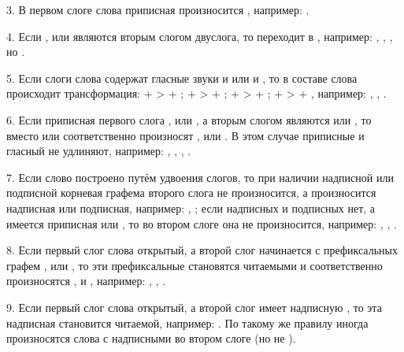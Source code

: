 3. В первом слоге слова приписная  произносится , например: .

4. Если ,  или  являются вторым слогом двуслога, то  переходит в , например: , , , но .

5. Если слоги слова содержат гласные звуки  и  или  и , то в составе слова происходит трансформация:  +  >  + ;  +  >  + ;  +  >  + ;  +  >  + , например: , , .

6. Если приписная первого слога ,  или , а вторым слогом являются  или , то вместо  или  соответственно произносят ,  или . В этом случае приписные  и гласный не удлиняют, например:
,
,
,
.

7. Если слово построено путём удвоения слогов, то при наличии надписной или подписной корневая графема второго слога не произносится, а произносится надписная или подписная, например:
, ;
если надписных и подписных нет, а имеется приписная  или , то во втором слоге она не произносится, например:
,
,
.

8. Если первый слог слова открытый, а второй слог начинается с префиксальных графем ,  или , то эти префиксальные становятся читаемыми и соответственно произносятся ,  и , например:
,
,
.

9. Если первый слог слова открытый, а второй слог имеет надписную , то эта надписная становится читаемой, например: . По такому же правилу иногда произносятся слова с надписными  во втором слоге (но не ).

